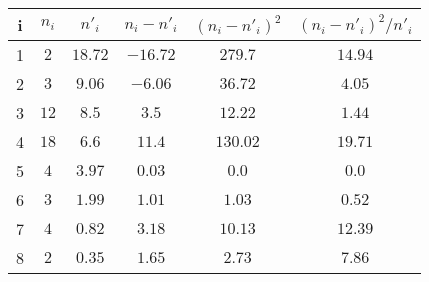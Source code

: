 \begin{tabular}{|c|c|c|c|c|c|}
    \hline
    i & $n_i$ & $n'_i$ & $n_i - n'_i$ & $(n_i - n'_i)^2$ & $(n_i - n'_i)^2/n'_i$\\
    \hline
    1 & $2$ & $18.72$ & $-16.72$ & $279.7$ & $14.94$\\
    \hline
    2 & $3$ & $9.06$ & $-6.06$ & $36.72$ & $4.05$\\
    \hline
    3 & $12$ & $8.5$ & $3.5$ & $12.22$ & $1.44$\\
    \hline
    4 & $18$ & $6.6$ & $11.4$ & $130.02$ & $19.71$\\
    \hline
    5 & $4$ & $3.97$ & $0.03$ & $0.0$ & $0.0$\\
    \hline
    6 & $3$ & $1.99$ & $1.01$ & $1.03$ & $0.52$\\
    \hline
    7 & $4$ & $0.82$ & $3.18$ & $10.13$ & $12.39$\\
    \hline
    8 & $2$ & $0.35$ & $1.65$ & $2.73$ & $7.86$\\
    \hline
\end{tabular}